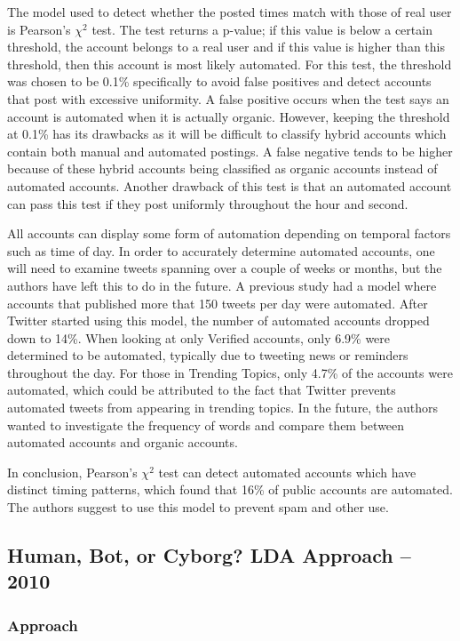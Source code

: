 \documentclass[11pt, oneside]{article}   	%
\begin{document}
\quad The model used to detect whether the posted times match with those of real user is Pearson's $\chi^2$ test.
The test returns a p-value; if this value is below a certain threshold, the account belongs to a real user and if this value is higher than this threshold, then this account is most likely automated.
For this test, the threshold was chosen to be 0.1\% specifically to avoid false positives and detect accounts that post with excessive uniformity.
A false positive occurs when the test says an account is automated when it is actually organic.
However, keeping the threshold at 0.1\% has its drawbacks as it will be difficult to classify hybrid accounts which contain both manual and automated postings.
A false negative tends to be higher because of these hybrid accounts being classified as organic accounts instead of automated accounts.
Another drawback of this test is that an automated account can pass this test if they post uniformly throughout the hour and second.
 
\quad All accounts can display some form of automation depending on temporal factors such as time of day.
In order to accurately determine automated accounts, one will need to examine tweets spanning over a couple of weeks or months, but the authors have left this to do in the future.
A previous study had a model where accounts that published more that 150 tweets per day were automated.
After Twitter started using this model, the number of automated accounts dropped down to 14\%.
When looking at only Verified accounts, only 6.9\% were determined to be automated, typically due to tweeting news or reminders throughout the day.
For those in Trending Topics, only 4.7\% of the accounts were automated, which could be attributed to the fact that Twitter prevents automated tweets from appearing in trending topics.
In the future, the authors wanted to investigate the frequency of words and compare them between automated accounts and organic accounts.
 
\quad In conclusion, Pearson's $\chi^2$ test can detect automated accounts which have distinct timing patterns, which found that 16\% of public accounts are automated. 
The authors suggest to use this model to prevent spam and other use.

\subsection*{Human, Bot, or Cyborg? LDA Approach -- 2010}

\subsubsection*{Approach}
\end{document}
